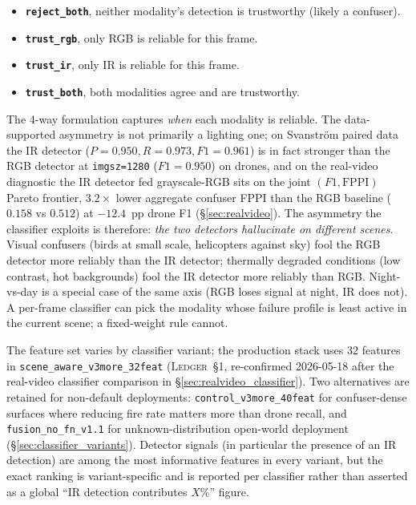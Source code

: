 \documentclass[12pt,a4paper,oneside,openright]{book}
\begin{document}
\begin{itemize}
    \item \textbf{\texttt{reject\_both}}, neither modality's detection is trustworthy (likely a confuser).
    \item \textbf{\texttt{trust\_rgb}}, only RGB is reliable for this frame.
    \item \textbf{\texttt{trust\_ir}}, only IR is reliable for this frame.
    \item \textbf{\texttt{trust\_both}}, both modalities agree and are trustworthy.
\end{itemize}

The 4-way formulation captures \emph{when} each modality is reliable. The data-supported asymmetry is not primarily a lighting one; on Svanstr\"om paired data the IR detector ($P=0.950, R=0.973, F1=0.961$) is in fact stronger than the RGB detector at \texttt{imgsz=1280} ($F1=0.950$) on drones, and on the real-video diagnostic the IR detector fed grayscale-RGB sits on the joint $(F1, \mathrm{FPPI})$ Pareto frontier, $3.2\times$ lower aggregate confuser FPPI than the RGB baseline ($0.158$ vs $0.512$) at $-12.4$~pp drone F1 (\S\ref{sec:realvideo}). The asymmetry the classifier exploits is therefore: \emph{the two detectors hallucinate on different scenes}. Visual confusers (birds at small scale, helicopters against sky) fool the RGB detector more reliably than the IR detector; thermally degraded conditions (low contrast, hot backgrounds) fool the IR detector more reliably than RGB. Night-vs-day is a special case of the same axis (RGB loses signal at night, IR does not). A per-frame classifier can pick the modality whose failure profile is least active in the current scene; a fixed-weight rule cannot.

The feature set varies by classifier variant; the production stack uses 32 features in \texttt{scene\_aware\_v3more\_32feat} (\textsc{Ledger}~\S1, re-confirmed 2026-05-18 after the real-video classifier comparison in \S\ref{sec:realvideo_classifier}). Two alternatives are retained for non-default deployments: \texttt{control\_v3more\_40feat} for confuser-dense surfaces where reducing fire rate matters more than drone recall, and \texttt{fusion\_no\_fn\_v1.1} for unknown-distribution open-world deployment (\S\ref{sec:classifier_variants}). Detector signals (in particular the presence of an IR detection) are among the most informative features in every variant, but the exact ranking is variant-specific and is reported per classifier rather than asserted as a global ``IR detection contributes $X\%$'' figure.
\end{document}
